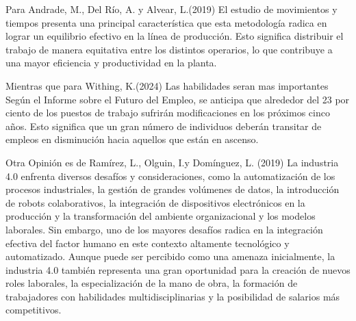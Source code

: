     Para Andrade, M., Del Río, A. y Alvear, L.(2019) El estudio de movimientos y tiempos presenta una principal característica que esta metodología radica en lograr un equilibrio efectivo en la línea de producción. Esto significa distribuir el trabajo de manera equitativa entre los distintos operarios, lo que contribuye a una mayor eficiencia y productividad en la planta.\cite{REF7}
    
    Mientras que para Withing, K.(2024) 
    Las habilidades seran mas importantes Según el Informe sobre el Futuro del Empleo, se anticipa que alrededor del 23 por ciento de los puestos de trabajo sufrirán modificaciones en los próximos cinco años. Esto significa que un gran número de individuos deberán transitar de empleos en disminución hacia aquellos que están en ascenso.\cite{REF8}
    
    Otra Opinión es de Ramírez, L., Olguin, I.y Domínguez, L. (2019) La industria 4.0 enfrenta diversos desafíos y consideraciones, como la automatización de los procesos industriales, la gestión de grandes volúmenes de datos, la introducción de robots colaborativos, la integración de dispositivos electrónicos en la producción y la transformación del ambiente organizacional y los modelos laborales. Sin embargo, uno de los mayores desafíos radica en la integración efectiva del factor humano en este contexto altamente tecnológico y automatizado. Aunque puede ser percibido como una amenaza inicialmente, la industria 4.0 también representa una gran oportunidad para la creación de nuevos roles laborales, la especialización de la mano de obra, la formación de trabajadores con habilidades multidisciplinarias y la posibilidad de salarios más competitivos.\cite{REF9}
    
